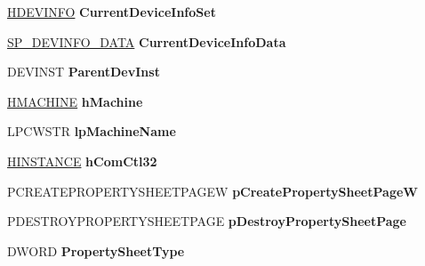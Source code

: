 \begin{DoxyCompactItemize}
\hyperlink{interfacevoid}{H\+D\+E\+V\+I\+N\+FO} {\bfseries Current\+Device\+Info\+Set}
\item 
\mbox{\label{struct___d_e_v_a_d_v_p_r_o_p___i_n_f_o_a13a8931c19ad8965576d5d9fcf6919ab}} 
\hyperlink{struct___s_p___d_e_v_i_n_f_o___d_a_t_a}{S\+P\+\_\+\+D\+E\+V\+I\+N\+F\+O\+\_\+\+D\+A\+TA} {\bfseries Current\+Device\+Info\+Data}
\item 
\mbox{\label{struct___d_e_v_a_d_v_p_r_o_p___i_n_f_o_af3f9755bebe67630593f856221812743}} 
D\+E\+V\+I\+N\+ST {\bfseries Parent\+Dev\+Inst}
\item 
\mbox{\label{struct___d_e_v_a_d_v_p_r_o_p___i_n_f_o_a2519116523623b710dbf8c555bd66922}} 
\hyperlink{interfacevoid}{H\+M\+A\+C\+H\+I\+NE} {\bfseries h\+Machine}
\item 
\mbox{\label{struct___d_e_v_a_d_v_p_r_o_p___i_n_f_o_a1982cd83449e304f6dade79b509c9497}} 
L\+P\+C\+W\+S\+TR {\bfseries lp\+Machine\+Name}
\item 
\mbox{\label{struct___d_e_v_a_d_v_p_r_o_p___i_n_f_o_a7c7c38441e2f98758bada121358d9552}} 
\hyperlink{interfacevoid}{H\+I\+N\+S\+T\+A\+N\+CE} {\bfseries h\+Com\+Ctl32}
\item 
\mbox{\label{struct___d_e_v_a_d_v_p_r_o_p___i_n_f_o_a241fc5748d450d731abb55424ae1b019}} 
P\+C\+R\+E\+A\+T\+E\+P\+R\+O\+P\+E\+R\+T\+Y\+S\+H\+E\+E\+T\+P\+A\+G\+EW {\bfseries p\+Create\+Property\+Sheet\+PageW}
\item 
\mbox{\label{struct___d_e_v_a_d_v_p_r_o_p___i_n_f_o_a5a540ce5e8aede3edad77fe9c8068a45}} 
P\+D\+E\+S\+T\+R\+O\+Y\+P\+R\+O\+P\+E\+R\+T\+Y\+S\+H\+E\+E\+T\+P\+A\+GE {\bfseries p\+Destroy\+Property\+Sheet\+Page}
\item 
\mbox{\label{struct___d_e_v_a_d_v_p_r_o_p___i_n_f_o_a1c9ecef8ba1d109b6e723c4acc24f646}} 
D\+W\+O\+RD {\bfseries Property\+Sheet\+Type}
\item 
\mbox{\label{struct___d_e_v_a_d_v_p_r_o_p___i_n_f_o_a3e8c92750d3bf2d1bbf67fd0c7acff47}} 

\end{DoxyCompactItemize}
